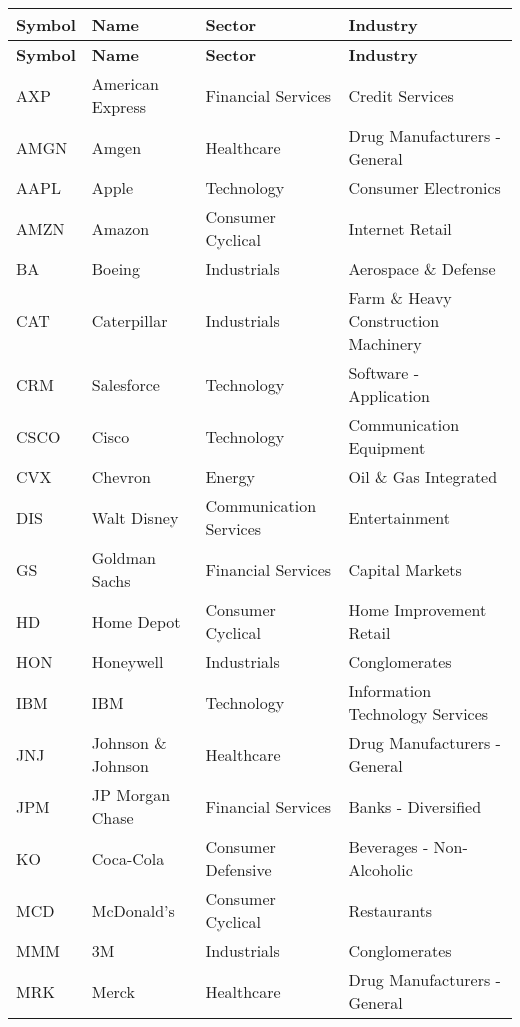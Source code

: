 \begin{longtable}{|p{2cm}|p{3cm}|p{4cm}|p{4cm}|}
\hline
\textbf{Symbol} & \textbf{Name} & \textbf{Sector} & \textbf{Industry} \\ \midrule
\endfirsthead

\hline
\textbf{Symbol} & \textbf{Name} & \textbf{Sector} & \textbf{Industry} \\ \midrule
\endhead

\endfoot

\hline
AXP & American Express & Financial Services & Credit Services \\ \hline
AMGN & Amgen & Healthcare & Drug Manufacturers - General \\ \hline
AAPL & Apple & Technology & Consumer Electronics \\ \hline
AMZN & Amazon & Consumer Cyclical & Internet Retail \\ \hline
BA & Boeing & Industrials & Aerospace \& Defense \\ \hline
CAT & Caterpillar & Industrials & Farm \& Heavy Construction Machinery \\ \hline
CRM & Salesforce & Technology & Software - Application \\ \hline
CSCO & Cisco & Technology & Communication Equipment \\ \hline
CVX & Chevron & Energy & Oil \& Gas Integrated \\ \hline
DIS & Walt Disney & Communication Services & Entertainment \\ \hline
GS & Goldman Sachs & Financial Services & Capital Markets \\ \hline
HD & Home Depot & Consumer Cyclical & Home Improvement Retail \\ \hline
HON & Honeywell & Industrials & Conglomerates \\ \hline
IBM & IBM & Technology & Information Technology Services \\ \hline
JNJ & Johnson \& Johnson & Healthcare & Drug Manufacturers - General \\ \hline
JPM & JP Morgan Chase & Financial Services & Banks - Diversified \\ \hline
KO & Coca-Cola & Consumer Defensive & Beverages - Non-Alcoholic \\ \hline
MCD & McDonald's & Consumer Cyclical & Restaurants \\ \hline
MMM & 3M & Industrials & Conglomerates \\ \hline
MRK & Merck & Healthcare & Drug Manufacturers - General \\ \hline

\end{longtable}
